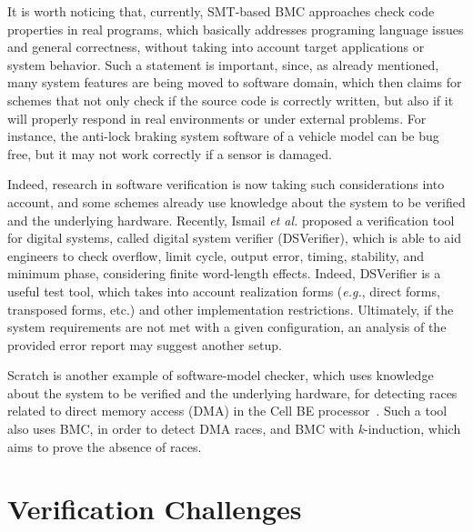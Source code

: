 \documentclass{acm_sen_article}
\begin{document}
It is worth noticing that, currently, SMT-based BMC approaches check code properties in real programs, which basically addresses programing language issues and general correctness, without taking into account target applications or system behavior. Such a statement is important, since, as already mentioned, many system features are being moved to software domain, which then claims for schemes that not only check if the source code is correctly written, but also if it will properly respond in real environments or under external problems. For instance, the anti-lock braking system software of a vehicle model can be bug free, but it may not work correctly if a sensor is damaged.

Indeed, research in software verification is now taking such considerations into account, and some schemes already use knowledge about the system to be verified and the underlying hardware. Recently, Ismail {\it et al.} \cite{dsv_spin2015}  proposed a verification tool for digital systems, called digital system verifier (DSVerifier), which is able to aid engineers to check overflow, limit cycle, output error, timing, stability, and minimum phase, considering finite word-length effects. Indeed, DSVerifier is a useful test tool, which takes into account realization forms ({\it e.g.}, direct forms, transposed forms, etc.) and other implementation restrictions. Ultimately, if the system requirements are not met with a given configuration, an analysis of the provided error report may suggest another setup. 

Scratch is another example of software-model checker, which uses knowledge about the system to be verified and the underlying hardware, for detecting races related to direct memory access (DMA) in the Cell BE processor~\cite{Donaldson10}. Such a tool also uses BMC, in order to detect DMA races, and BMC with \textit{k}-induction, which aims to prove the absence of races.

\section{Verification Challenges}
\end{document}
